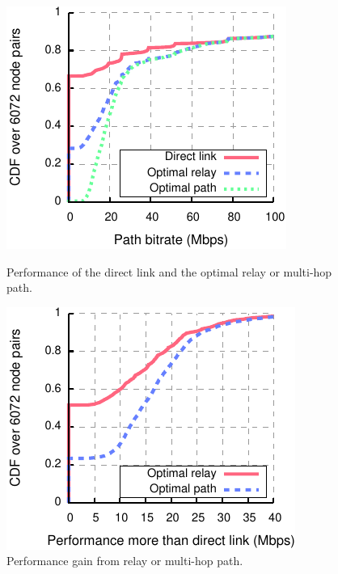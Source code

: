 \begin{figure}[t]
\begin{minipage}{0.48\textwidth}
	\centering
	\includegraphics[width=\textwidth]{figures/applications/relay_gains.pdf}
	\caption{\label{fig:relay_sel_gains}Performance of the direct link and the optimal relay or multi-hop path.}
\end{minipage}
\hfill
\begin{minipage}{0.48\textwidth}
	\centering
	\includegraphics[width=\textwidth]{figures/applications/relay_gains_mbps.pdf}
	\caption{\label{fig:relay_sel_gains_mbps}Performance gain from relay or multi-hop path.}
\end{minipage}
\end{figure}

